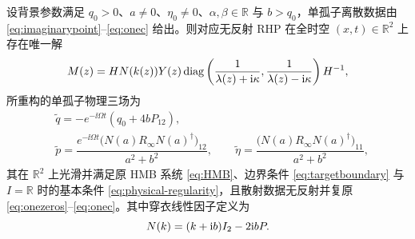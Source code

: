 \begin{theorem}\label{thm:oneRHP}
设背景参数满足 $q_0>0$、$a\ne0$、$\eta_0\ne0$、$\alpha,\beta\in\mathbb R$ 与 $b>q_0$，单孤子离散数据由 \eqref{eq:imaginarypoint}--\eqref{eq:onec} 给出。则对应无反射 RHP 在全时空 $(x,t)\in\mathbb R^2$ 上存在唯一解
\begin{equation}\label{eq:explicitM}
M(z)=HN(k(z))Y(z)
\operatorname{diag}\left(\dfrac{1}{\lambda(z)+\mathrm{i}\kappa},\dfrac{1}{\lambda(z)-\mathrm{i}\kappa}\right)H^{-1},
\end{equation}
所重构的单孤子物理三场为
\begin{equation}\label{eq:finalfields}
\begin{aligned}
&\widetilde q=-e^{-\ii\Omega t}(q_0+4bP_{12}),\\
&\widetilde p=\dfrac{e^{-\ii\Omega t}\bigl(N(a)R_\infty N(a)^\dagger\bigr)_{12}}{a^2+b^2},\qquad
\widetilde\eta=\dfrac{\bigl(N(a)R_\infty N(a)^\dagger\bigr)_{11}}{a^2+b^2},
\end{aligned}
\end{equation}
其在 $\mathbb R^2$ 上光滑并满足原 HMB 系统 \eqref{eq:HMB}、边界条件 \eqref{eq:targetboundary} 与 $I=\mathbb R$ 时的基本条件 \eqref{eq:physical-regularity}，且散射数据无反射并复原 \eqref{eq:onezeros}--\eqref{eq:onec}。其中穿衣线性因子定义为
\begin{equation}\label{eq:Nfactor}
N(k)=(k+\mathrm{i} b)I_2-2\mathrm{i} bP.
\end{equation}
\end{theorem}
